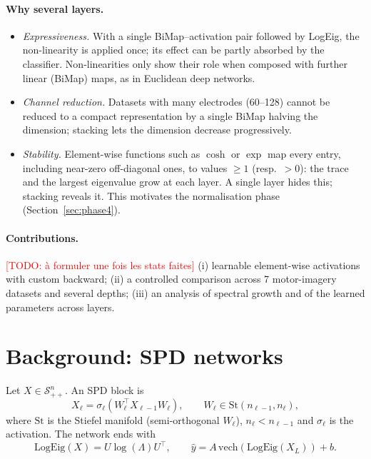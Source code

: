 \documentclass[11pt,a4paper]{article}
\newcommand{\todo}[1]{\textcolor{red}{[TODO: #1]}}
\newcommand{\spd}{\mathcal{S}_{++}}
\begin{document}
\paragraph{Why several layers.}
\begin{itemize}
  \item \emph{Expressiveness.} With a single BiMap--activation pair followed by LogEig,
        the non-linearity is applied once; its effect can be partly absorbed by the
        classifier. Non-linearities only show their role when composed with further
        linear (BiMap) maps, as in Euclidean deep networks.
  \item \emph{Channel reduction.} Datasets with many electrodes (60--128) cannot be
        reduced to a compact representation by a single BiMap halving the dimension;
        stacking lets the dimension decrease progressively.
  \item \emph{Stability.} Element-wise functions such as $\cosh$ or $\exp$ map every
        entry, including near-zero off-diagonal ones, to values $\geq 1$ (resp.\ $>0$):
        the trace and the largest eigenvalue grow at each layer. A single layer hides
        this; stacking reveals it. This motivates the normalisation phase
        (Section~\ref{sec:phase4}).
\end{itemize}

\paragraph{Contributions.}
\todo{à formuler une fois les stats faites} (i) learnable element-wise activations with
custom backward; (ii) a controlled comparison across 7 motor-imagery datasets and several
depths; (iii) an analysis of spectral growth and of the learned parameters across layers.

\section{Background: SPD networks}
\label{sec:background}

Let $X \in \spd^n$. An SPD block is
\begin{equation}
  X_{\ell} = \sigma_\ell\!\left(W_\ell^\top X_{\ell-1} W_\ell\right),
  \qquad W_\ell \in \mathrm{St}(n_{\ell-1}, n_\ell),
\end{equation}
where $\mathrm{St}$ is the Stiefel manifold (semi-orthogonal $W_\ell$), $n_\ell < n_{\ell-1}$
and $\sigma_\ell$ is the activation. The network ends with
\begin{equation}
  \mathrm{LogEig}(X) = U \log(\Lambda) U^\top, \qquad
  \hat y = A \,\mathrm{vech}\!\left(\mathrm{LogEig}(X_L)\right) + b .
\end{equation}
\end{document}

